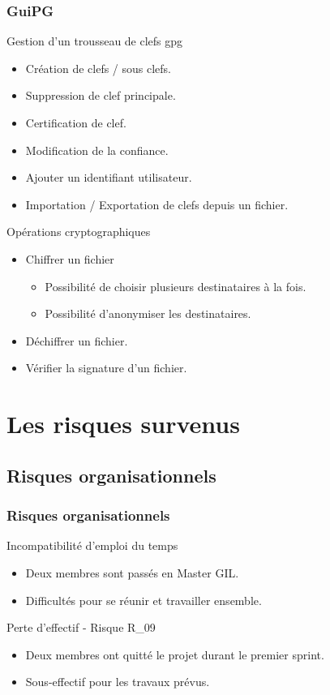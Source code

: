 \begin{frame}
  \frametitle{\color{white}GuiPG}
  \begin{block}{Gestion d'un trousseau de clefs gpg}
      \begin{itemize}
        \item Création de clefs / sous clefs.
        \item Suppression de clef principale.
        \item Certification de clef.
        \item Modification de la confiance.
        \item Ajouter un identifiant utilisateur.
        \item Importation / Exportation de clefs depuis un fichier.
      \end{itemize}
    \end{block}
    \pause
    \begin{block}{Opérations cryptographiques}
      \begin{itemize}
        \item Chiffrer un fichier
	  \begin{itemize}
	   \item Possibilité de choisir plusieurs destinataires à la fois.
	   \item Possibilité d'anonymiser les destinataires.
	  \end{itemize}
        \item Déchiffrer un fichier.
        \item Vérifier la signature d'un fichier.
      \end{itemize}
    \end{block}
\end{frame}


\section{Les risques survenus}
  \subsection{Risques organisationnels}
    \begin{frame}
      \frametitle{\color{white}Risques organisationnels}
      \begin{block}{Incompatibilité d'emploi du temps}
	\begin{itemize}
	  \item Deux membres sont passés en Master GIL.
	  \item Difficultés pour se réunir et travailler ensemble.
	\end{itemize}
      \end{block}
      \begin{block}{Perte d'effectif - Risque R\_09}
      	\begin{itemize}
      	  \item Deux membres ont quitté le projet durant le premier sprint.
      	  \item Sous-effectif pour les travaux prévus.
      	\end{itemize}
      \end{block}
    \end{frame}
    
